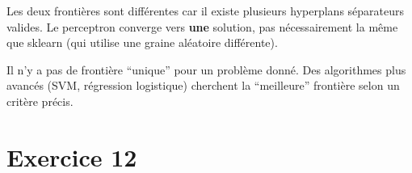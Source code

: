 Les deux fronti\`{e}res sont diff\'{e}rentes car il existe plusieurs hyperplans s\'{e}parateurs valides. Le perceptron converge vers \textbf{une} solution, pas n\'{e}cessairement la m\^{e}me que sklearn (qui utilise une graine al\'{e}atoire diff\'{e}rente).

\begin{retenirbox}
    Il n'y a pas de fronti\`{e}re ``unique'' pour un probl\`{e}me donn\'{e}. Des algorithmes plus avanc\'{e}s
    (SVM, r\'{e}gression logistique) cherchent la ``meilleure'' fronti\`{e}re selon un crit\`{e}re pr\'{e}cis.
\end{retenirbox}

\section*{Exercice 12 \hfill \exoavance}

\separateur

